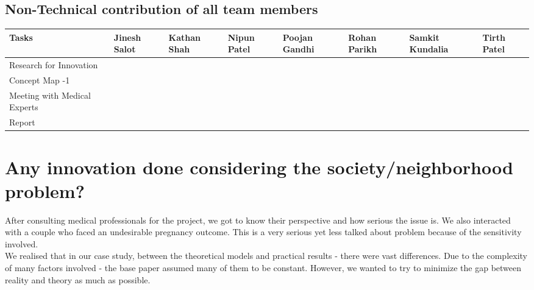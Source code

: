\documentclass{article}
\begin{document}
\subsection{Non-Technical contribution of all team members }
\begin{table}[H]
		\begin{tabular}{|p{3.8154cm}|p{1.4154cm}|p{1.4154cm}|p{1.4154cm}|p{1.4154cm}|p{1.4154cm}|p{1.4154cm}|p{1.4154cm}|}
			\hline
			Tasks  & Jinesh Salot & Kathan Shah & Nipun Patel & Poojan Gandhi & Rohan Parikh & Samkit Kundalia & Tirth Patel \\ \hline
			Research for Innovation &  {\Large \checkmark}    & {\Large \checkmark}      &{\Large \checkmark}        &  {\Large \checkmark}        & {\Large \checkmark}    &   {\Large \checkmark}    &  {\Large \checkmark}       \\ \hline
			Concept Map -1 &   {\Large \checkmark}   &  {\Large \checkmark}     &        &   {\Large \checkmark}       &     &      &  {\Large \checkmark}       \\ \hline
			Meeting with Medical Experts &      &  {\Large \checkmark}     &    {\Large \checkmark}    &          &   {\Large \checkmark}  &   {\Large \checkmark}    &       \\ \hline
			Report & {\Large \checkmark}     &       &   {\Large \checkmark}     &          & {\Large \checkmark}    &  {\Large \checkmark}     & {\Large \checkmark}      \\ \hline
		\end{tabular}
\end{table}


\section{Any innovation done considering the society/neighborhood problem?}
After consulting medical professionals for the project, we got to know their perspective and how serious the issue is. We also interacted with a couple who faced an undesirable pregnancy outcome. This is a very serious yet less talked about problem because of the sensitivity involved. \\

We realised that in our case study, between the theoretical models and practical results - there were vast differences. Due to the complexity of many factors involved - the base paper assumed many of them to be constant. However, we wanted to try to minimize the gap between reality and theory as much as possible.\\
\end{document}
